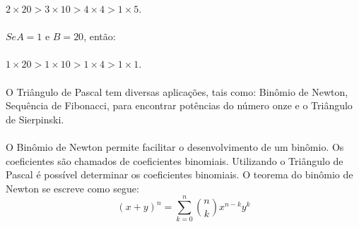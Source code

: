 \documentclass[a4paper, 12pt]{article}
\begin{document}
\begin{enumerate}
\begin{itemize}
$2 \times 20 > 3 \times 10 > 4 \times 4 > 1 \times 5$.\\\\

$Se A = 1$ e $B = 20$, então:\\\\

$1 \times 20 > 1 \times 10 > 1 \times 4 > 1 \times 1$.\\\\

O Triângulo de Pascal tem diversas aplicações, tais como: Binômio de Newton, Sequência de Fibonacci, para encontrar potências do número onze e o Triângulo de Sierpinski.\\\\

O Binômio de Newton permite facilitar o desenvolvimento de um binômio. Os coeficientes são chamados de coeficientes binomiais. Utilizando o Triângulo de Pascal é possível determinar os coeficientes binomiais. O teorema do binômio de Newton se escreve como segue:
$$(x+y)^{n}=\sum_{k=0}^{n}\binom{n}{k}x^{n-k}y^k$$
\end{itemize}
\end{enumerate}
\end{document}
